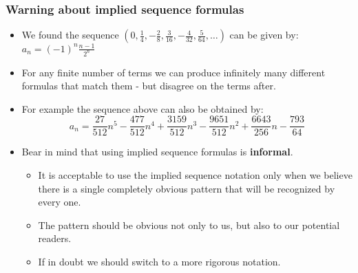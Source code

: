 \begin{frame}
\frametitle{Warning about implied sequence formulas}
\begin{itemize}
\item We found the sequence 
$
\left( %
0,%
 \frac{1}{4},%
-\frac{2}{8},%
 \frac{3}{16},%
-\frac{4}{32},%
 \frac{5}{64},%
\ldots
\right)%
$
can be given by:
$
a_n =(-1)^n\frac{n-1}{2^n}
$
\item<2-> For any finite number of terms we can produce infinitely many different formulas that match them - but disagree on the terms after.
\item<3-> For example the sequence above can also be obtained by:
\[
a_n=\frac{27}{512} n^{5}-\frac{477}{512} n^{4}+\frac{3159}{512} n^{3}-\frac{9651}{512} n^{2}+\frac{6643}{256} n-\frac{793}{64}
\]

\item<5-> Bear in mind that using implied sequence formulas is \textbf{informal}. 
\begin{itemize}
\item<6-> It is acceptable to use the implied sequence notation only when we believe there is a single completely obvious pattern that will be recognized by every one.
\item<7-> The pattern should be obvious not only to us, but also to our potential readers.
\item<8-> If in doubt we should switch to a more rigorous notation. 
\end{itemize}  

\end{itemize}


\end{frame}